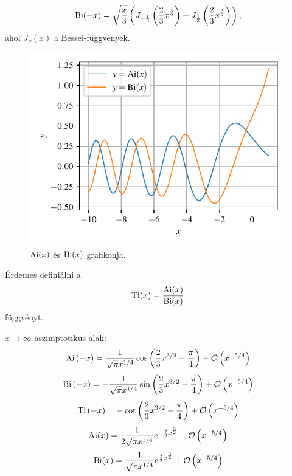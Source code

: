 \begin{equation}
	\operatorname{Bi}(-x) = \sqrt{\frac{x}{3}}\left(J_{-\frac{1}{3}}\left(\frac{2}{3}x^{\frac{3}{2}}\right)+J_{\frac{1}{3}}\left(\frac{2}{3}x^{\frac{3}{2}}\right)\right),
	\label{airy:bi-}
\end{equation}
ahol $J_\nu(x)$ a Bessel-függvények.
\begin{figure}
	\centering
	\includegraphics[scale=1]{./figs/airy.pdf}
	\caption[Airy-függvények]{$\operatorname{Ai}(x)$ és $\operatorname{Bi}(x)$ grafikonja.}
\end{figure}
Érdemes definiálni a
\begin{equation}
	\operatorname{Ti}(x) = \frac{\operatorname{Ai}(x)}{\operatorname{Bi}(x)}
\end{equation}
függvényt.

$x \to \infty$ aszimptotikus alak:
\begin{equation}
	\operatorname{Ai}\left(-x\right) = \frac{1}{\sqrt{\pi}x^{1/4}}\cos\left(\frac{2}{3}x^{3/2} - \frac{\pi}{4}\right) + \mathcal{O}\left(x^{-5/4}\right)
\end{equation}
\begin{equation}
	\operatorname{Bi}\left(-x\right) = -\frac{1}{\sqrt{\pi}x^{1/4}}\sin\left(\frac{2}{3}x^{3/2} - \frac{\pi}{4}\right) + \mathcal{O}\left(x^{-5/4}\right)
\end{equation}
\begin{equation}
	\operatorname{Ti}\left(-x\right) = -\cot\left( \frac{2}{3}x^{3/2} - \frac{\pi}{4} \right) + \mathcal{O}\left(x^{-5/4}\right)
	\label{airy:tiapprox}
\end{equation}
\begin{equation}
	\operatorname{Ai}(x) = \frac{1}{2\sqrt{\pi}x^{1/4}}e^{-\frac{2}{3}x^{\frac{3}{2}}}+\mathcal{O}\left(x^{-5/4}\right)
\end{equation}
\begin{equation}
	\operatorname{Bi}(x) = \frac{1}{ \sqrt{\pi}x^{1/4}}e^{ \frac{2}{3}x^{\frac{3}{2}}}+\mathcal{O}\left(x^{-5/4}\right)
\end{equation}

